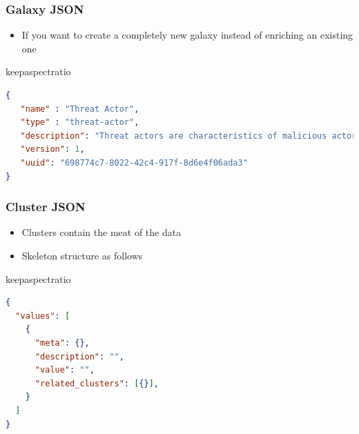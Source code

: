 

\begin{frame}[fragile]
	\frametitle{Galaxy JSON}
    \begin{itemize}
    	\item If you want to create a completely new galaxy instead of enriching an existing one
    \end{itemize}
    \begin{adjustbox}{keepaspectratio}
        \begin{lstlisting}[language=json,firstnumber=1]
{
   "name" : "Threat Actor",
   "type" : "threat-actor",
   "description": "Threat actors are characteristics of malicious actors (or adversaries) representing a cyber attack threat including presumed intent and historically observed behaviour.",
   "version": 1,
   "uuid": "698774c7-8022-42c4-917f-8d6e4f06ada3"
}
\end{lstlisting}
    \end{adjustbox}
\end{frame}

\begin{frame}[fragile]
	\frametitle{Cluster JSON}
    \begin{itemize}
    	\item Clusters contain the meat of the data
    	\item Skeleton structure as follows
    \end{itemize}
    \begin{adjustbox}{keepaspectratio}
        \begin{lstlisting}[language=json,firstnumber=1]
{
  "values": [
    {
      "meta": {},
      "description": "",
      "value": "",
      "related_clusters": [{}],
    }
  ]
}

\end{lstlisting}
    \end{adjustbox}
\end{frame}

